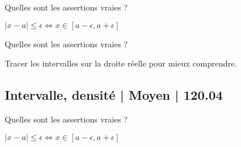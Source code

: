 \begin{question}
Quelles sont les assertions vraies ?
\begin{answers}
    \good{$x \in ]5;7[ \iff |x-6|<1$}

    \bad{$x \in ]5;7[ \iff |x-1|<6$}


\end{answers}
\begin{explanations}
$|x-a| \le \epsilon \iff x \in [a-\epsilon,a+\epsilon]$
\end{explanations}
\end{question}


\begin{question}
Quelles sont les assertions vraies ?
\begin{answers}
    \bad{$[3,7] \cup [8,10] = [3,10]$}

    \bad{$[-3,5] \cap [2,7] = [-3,7]$}

    \bad{$[a,b[\cup ]a,b] = ]a,b[$}

    \good{$[a,b[\cap ]a,b] = ]a,b[$}   
\end{answers}
\begin{explanations}
Tracer les intervalles sur la droite réelle pour mieux comprendre.
\end{explanations}
\end{question}



\subsection{Intervalle, densité | Moyen | 120.04}



\begin{question}
Quelles sont les assertions vraies ?
\begin{answers}



\end{answers}
\begin{explanations}
$|x-a| \le \epsilon \iff x \in [a-\epsilon,a+\epsilon]$
\end{explanations}
\end{question}




